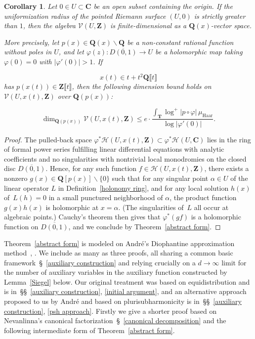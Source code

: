 \documentclass[10pt]{amsart}
\def\SSS{\S}
\def\SSSS{\S}
\def\SSSSs{\S\S}
\renewcommand\setminus{\smallsetminus}
\def\T{\mathbf{T}}
\def\Z{\mathbf{Z}}
\def\Q{\mathbf{Q}}
\newtheorem{cor}[subsubsection]{Corollary}
\theoremstyle{remark}
\numberwithin{equation}{subsection}
\def\numequation{\addtocounter{subsubsection}{1}\begin{equation}}
\def\C{\mathbf{C}}
\begin{document}
\begin{cor} \label{holonomy} 
Let $0 \in U \subset \C$ be an open subset containing the origin. If the uniformization radius of the pointed
Riemann surface $(U,0)$ is strictly greater than $1$, then the algebra $\mathcal{V}(U,\Z)$ is finite-dimensional as a $\Q(x)$-vector space. 

More precisely, let $p(x) \in \Q(x) \setminus \Q$ be a non-constant  rational function without poles in $U$, 
and let
$\varphi(z) : \overline{D(0,1)} \to U$ be  a holomorphic map taking $\varphi(0) = 0$ with $|\varphi'(0)| > 1$. 
 If
\numequation 
x(t) \in t +  t^2 \Q\llbracket t \rrbracket
\end{equation}
has $p(x(t)) \in \Z\llbracket t \rrbracket$, 
then
 the following dimension bound holds on $\mathcal{V}(U,x(t),\Z)$ over
$\Q(p(x))$:
  \numequation \label{dimensionbound}
\dim_{\Q(p(x))} \mathcal{V}(U,x(t),\Z)   \leq e  \cdot \frac{  \int_{\T} \log^+{|p \circ \varphi|} \, \mu_{\mathrm{Haar}}}{\log{|\varphi'(0)|}}.
  \end{equation}



\end{cor}



\begin{proof}
 The pulled-back space $\varphi^*\mathcal{H}(U,  x(t) , \Z) \subset \varphi^* \mathcal{H}(U,\C)$
 lies in the ring of formal
power series fulfilling linear differential equations with analytic coefficients and no singularities with nontrivial local monodromies on the closed
disc $\overline{D(0,1)}$. Hence, for any such function $f \in \mathcal{H}(U,  x(t) , \Z)$, there exists a nonzero $g(x)\in \Q[p(x)] \setminus \{0\}$ such that for any singular point $\alpha\in U$ of the linear operator $L$ in Definition~\ref{holonomy ring}, and for any local solution $h(x)$ of~$L(h) = 0$ in a small punctured neighborhood of $\alpha$, the product function $g(x)h(x)$ is holomorphic at $x = \alpha$. 
(The singularities of~$L$ all occur at algebraic points.) 
Cauchy's theorem then gives that $\varphi^*(gf)$ is a holomorphic function on $\overline{D(0,1)}$, and we conclude by Theorem~\ref{abstract form}.
\end{proof}




Theorem~\ref{abstract form} is modeled on Andr\'e's Diophantine approximation method~\cite[\SSS~VIII]{AndreG}, \cite[\SSS~5]{Andre}. We include as many as three proofs, all sharing a common basic framework~\SSSS~\ref{auxiliary construction} and relying crucially on a $d \to \infty$ limit for the number of auxiliary variables in the auxiliary function constructed by Lemma~\ref{Siegel} below. Our original treatment was based on equidistribution and is in~\SSSSs~\ref{auxiliary construction}, \ref{initial argument},  and an alternative approach proposed to us by Andr\'e and based on plurisubharmonicity is in~\SSSSs~\ref{auxiliary construction}, \ref{psh approach}.
 Firstly we give a shorter proof based on  Nevanlinna's canonical factorization~\SSSS~\ref{canonical decomposition} and the following intermediate form of Theorem~\ref{abstract form}. 
\end{document}
